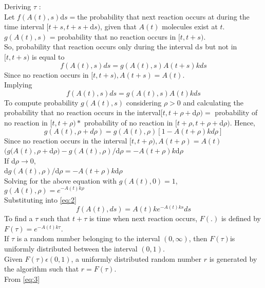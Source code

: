 \documentclass[10 pt]{article}
\begin{document}
\begin{multicols}{2}
\begin{flushleft}
Deriving $\tau$ :\\
Let $f(A(t),s)$d$s = $the probability that next reaction occurs at during the time interval $[t+s,t+s+$d$s)$, given that $A(t)$ molecules exist at $t$.\\
$g(A(t),s)$ = probability that no reaction occurs in $[t,t+s)$.\\
So, probability that reaction occurs only during the interval d$s$ but not in $[t,t+s)$ is equal to
\begin{equation}
f(A(t),s)ds = g(A(t),s)A(t+s)k ds
\end{equation}
Since no reaction occurs in $[t, t + s), A(t + s) = A(t)$.\\
Implying  
\begin{equation}\label{eq:2} 
f(A(t),s)ds = g(A(t),s)A(t)k ds 
\end{equation}
To compute probability $g(A(t),s)$ considering $\rho >0$ and calculating the probability that no reaction occurs in the interval$[t,t+\rho + $d$\rho) =$ probability of no reaction in $[t,t+ \rho) *$ probability of no reaction in $[t+\rho,t+\rho + $d$\rho)$. Hence,
\begin{equation}
g(A(t),\rho + d\rho) = g(A(t),\rho)[1-A(t+\rho)k d\rho]
\end{equation}
Since no reaction occurs in the interval $[t,t+\rho), A(t + \rho) = A(t)$\\
$(g(A(t),\rho + $d$\rho)- g(A(t),\rho)/$d$\rho = -A(t+\rho)k $d$\rho$\\
If d$\rho \rightarrow 0$,\\
d$g(A(t),\rho)/$d$\rho = -A(t+\rho)k $d$\rho$\\
Solving for the above equation with $g(A(t),0)=1$,\\
$g(A(t),\rho) = e^{-A(t)k\rho}$\\
Substituting into \ref{eq:2}
\begin{equation}\label{eq:3}
f(A(t),ds) = A(t)k e^{-A(t)ks}ds
\end{equation}
To find a $\tau$ such that $t+\tau$ is time when next reaction occurs, $F(.)$ is defined by $F(\tau) = e^{-A(t)k\tau}$.\\
If $\tau$ is a random number belonging to the interval $(0,\infty)$, then $F(\tau)$is uniformly distributed between the interval $(0,1)$.\\
Given $F(\tau)\epsilon (0,1)$, a uniformly distributed random number $r$ is generated by the algorithm such that $r=F(\tau)$.\\
From \ref{eq:3} \begin{equation}\label{eq:4}

\end{equation}
\end{flushleft}
\end{multicols}
\end{document}
